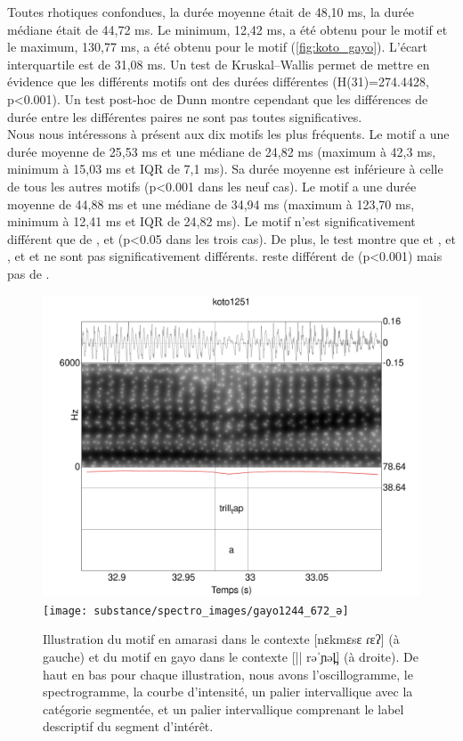 Toutes rhotiques confondues, la durée moyenne était de 48,10 ms, la durée médiane était de 44,72 ms. Le minimum, 12,42 ms, a été obtenu pour le motif  et le maximum, 130,77 ms, a été obtenu pour le motif  (\autoref{fig:koto_gayo}). L'écart interquartile est de 31,08 ms.
Un test de Kruskal–Wallis permet de mettre en évidence que les différents motifs ont des durées différentes (H(31)=274.4428, p<0.001). Un test post-hoc de Dunn montre cependant que les différences de durée entre les différentes paires ne sont pas toutes significatives. \\

Nous nous intéressons à présent aux dix motifs les plus fréquents.
Le motif  a une durée moyenne de 25,53 ms et une médiane de 24,82 ms (maximum à 42,3 ms, minimum à 15,03 ms et IQR de 7,1 ms). Sa durée moyenne est inférieure à celle de tous les autres motifs (p<0.001 dans les neuf cas).
Le motif  a une durée moyenne de 44,88 ms et une médiane de 34,94 ms (maximum à 123,70 ms, minimum à 12,41 ms et IQR de 24,82 ms). Le motif  n'est significativement différent que de ,  et  (p<0.05 dans les trois cas).
De plus, le test montre que  et ,  et , et  et  ne sont pas significativement différents.  reste différent de  (p<0.001) mais pas de . \\

\begin{figure}
	\centering
	\includegraphics[width=0.45\linewidth]{substance/spectro_images/koto1251_872_ɛrɛ}
	\texttt{[image: substance/spectro\_images/gayo1244\_672\_ə]}
	\caption[Illustrations des motifs  et ]{Illustration du motif  en amarasi dans le contexte [nɛkmɛsɛ ɾɛʔ] (à gauche) et du motif  en gayo dans le contexte [|| rəˈɲəl̪] (à droite). De haut en bas pour chaque illustration, nous avons l'oscillogramme, le spectrogramme, la courbe d'intensité, un palier intervallique avec la catégorie segmentée, et un palier intervallique comprenant le label descriptif du segment d'intérêt.}
	\label{fig:koto_gayo}
\end{figure}

